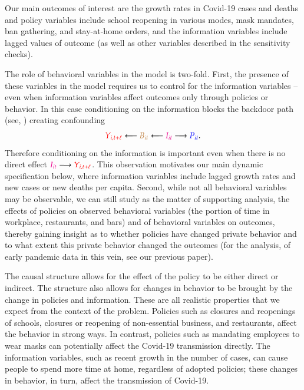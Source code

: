 \documentclass[9pt,twoside,lineno]{pnas-new}
\theoremstyle{definition}
\def\bcolor{\color{brown}}
\def\pcolor{\color{blue}}
\def\icolor{\color{magenta}}
\def\ycolor{\color{red}}
\begin{document}
Our main outcomes of interest are the growth rates in Covid-19 cases and deaths and policy variables include school reopening in various modes, mask mandates, ban gathering, and stay-at-home orders,  and the information variables include lagged values of outcome (as well as other variables described in the sensitivity checks). %


The role of behavioral variables in the model is two-fold. First, the presence of these variables in the model requires us to control for the information variables -- even when information variables affect outcomes only through policies or behavior.  In this case conditioning on the information blocks the backdoor path (see, \cite{pearl:causality}) creating confounding $${\ycolor Y_{i,t+\ell}} \longleftarrow {\bcolor B_{it}} \longleftarrow  {\icolor I_{it}} \longrightarrow {\pcolor P_{it}}.$$  Therefore conditioning on the information is important even when there is no direct effect  ${\icolor I_{it}} \longrightarrow {\ycolor Y_{i,t+\ell}}$. This observation motivates our main dynamic specification below, where information variables include lagged growth rates and new cases or new deaths per capita. Second, while not all behavioral variables may be observable, we can still study as the matter of supporting analysis, the effects of policies on observed behavioral variables (the portion of time in workplace, restaurants, and bars) and of behavioral variables on outcomes, thereby gaining insight as to whether policies have changed private behavior and to what extent this private behavior changed the outcomes  (for the analysis, of early pandemic data in this vein, see our previous paper).

The causal structure allows for the effect of the policy to be either direct or indirect. The structure also allows for changes in behavior to be brought by the change in policies and information. These are all realistic properties that we expect from the context of the problem. Policies such as closures and reopenings of schools, closures or reopening of non-essential business, and restaurants, affect the behavior in strong ways.  In contrast, policies such as mandating employees to wear masks can potentially affect the Covid-19 transmission directly.  The information variables, such as recent growth in the number of cases, can cause people to spend more time at home, regardless of adopted policies; these changes in
behavior, in turn, affect the transmission of Covid-19.
\end{document}
